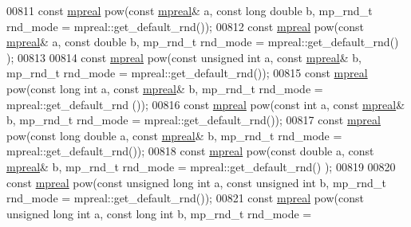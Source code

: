\begin{DoxyCode}
00811 \textcolor{keyword}{const} \hyperlink{classmpfr_1_1mpreal}{mpreal} pow(\textcolor{keyword}{const} \hyperlink{classmpfr_1_1mpreal}{mpreal}& a, \textcolor{keyword}{const} \textcolor{keywordtype}{long} \textcolor{keywordtype}{double} b, mp\_rnd\_t rnd\_mode = 
      mpreal::get\_default\_rnd());
00812 \textcolor{keyword}{const} \hyperlink{classmpfr_1_1mpreal}{mpreal} pow(\textcolor{keyword}{const} \hyperlink{classmpfr_1_1mpreal}{mpreal}& a, \textcolor{keyword}{const} \textcolor{keywordtype}{double} b, mp\_rnd\_t rnd\_mode = mpreal::get\_default\_rnd()
      );
00813 
00814 \textcolor{keyword}{const} \hyperlink{classmpfr_1_1mpreal}{mpreal} pow(\textcolor{keyword}{const} \textcolor{keywordtype}{unsigned} \textcolor{keywordtype}{int} a, \textcolor{keyword}{const} \hyperlink{classmpfr_1_1mpreal}{mpreal}& b, mp\_rnd\_t rnd\_mode = 
      mpreal::get\_default\_rnd());
00815 \textcolor{keyword}{const} \hyperlink{classmpfr_1_1mpreal}{mpreal} pow(\textcolor{keyword}{const} \textcolor{keywordtype}{long} \textcolor{keywordtype}{int} a, \textcolor{keyword}{const} \hyperlink{classmpfr_1_1mpreal}{mpreal}& b, mp\_rnd\_t rnd\_mode = mpreal::get\_default\_rnd
      ());
00816 \textcolor{keyword}{const} \hyperlink{classmpfr_1_1mpreal}{mpreal} pow(\textcolor{keyword}{const} \textcolor{keywordtype}{int} a, \textcolor{keyword}{const} \hyperlink{classmpfr_1_1mpreal}{mpreal}& b, mp\_rnd\_t rnd\_mode = mpreal::get\_default\_rnd());
00817 \textcolor{keyword}{const} \hyperlink{classmpfr_1_1mpreal}{mpreal} pow(\textcolor{keyword}{const} \textcolor{keywordtype}{long} \textcolor{keywordtype}{double} a, \textcolor{keyword}{const} \hyperlink{classmpfr_1_1mpreal}{mpreal}& b, mp\_rnd\_t rnd\_mode = 
      mpreal::get\_default\_rnd());
00818 \textcolor{keyword}{const} \hyperlink{classmpfr_1_1mpreal}{mpreal} pow(\textcolor{keyword}{const} \textcolor{keywordtype}{double} a, \textcolor{keyword}{const} \hyperlink{classmpfr_1_1mpreal}{mpreal}& b, mp\_rnd\_t rnd\_mode = mpreal::get\_default\_rnd()
      );
00819 
00820 \textcolor{keyword}{const} \hyperlink{classmpfr_1_1mpreal}{mpreal} pow(\textcolor{keyword}{const} \textcolor{keywordtype}{unsigned} \textcolor{keywordtype}{long} \textcolor{keywordtype}{int} a, \textcolor{keyword}{const} \textcolor{keywordtype}{unsigned} \textcolor{keywordtype}{int} b, mp\_rnd\_t rnd\_mode = 
      mpreal::get\_default\_rnd());
00821 \textcolor{keyword}{const} \hyperlink{classmpfr_1_1mpreal}{mpreal} pow(\textcolor{keyword}{const} \textcolor{keywordtype}{unsigned} \textcolor{keywordtype}{long} \textcolor{keywordtype}{int} a, \textcolor{keyword}{const} \textcolor{keywordtype}{long} \textcolor{keywordtype}{int} b, mp\_rnd\_t rnd\_mode = 

\end{DoxyCode}
